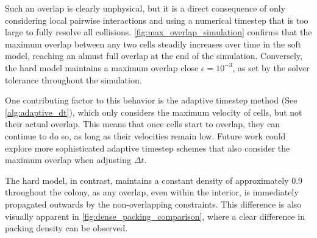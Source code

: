 \documentclass[conference]{IEEEtran}
\begin{document}
Such an overlap is clearly unphysical, but it is a direct consequence of only considering local pairwise interactions and using a numerical timestep that is too large to fully resolve all collisions. \autoref{fig:max_overlap_simulation} confirms that the maximum overlap between any two cells steadily increases over time in the soft model, reaching an almust full overlap at the end of the simulation. Conversely, the hard model maintains a maximum overlap close $\epsilon = 10^{-3}$, as set by the solver tolerance throughout the simulation.

One contributing factor to this behavior is the adaptive timestep method (See \autoref{alg:adaptive_dt}), which only considers the maximum velocity of cells, but not their actual overlap. This means that once cells start to overlap, they can continue to do so, as long as their velocities remain low. Future work could explore more sophisticated adaptive timestep schemes that also consider the maximum overlap when adjusting $\Delta t$.

The hard model, in contrast, maintains a constant density of approximately 0.9 throughout the colony, as any overlap, even within the interior, is immediately propagated outwards by the non-overlapping constraints. This difference is also visually apparent in \autoref{fig:dense_packing_comparison}, where a clear difference in packing density can be observed.
\end{document}
